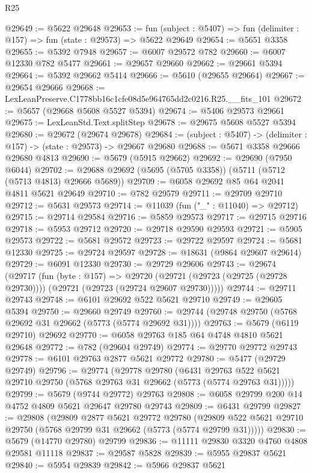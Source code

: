 \begin{lexlean}{R25}
\begin{coremodule}
@29649 := @5622 @29648
@29653 := fun (subject : @5407) => fun (delimiter : @157) => fun (state : @29573) => @5622 @29649
@29654 := @5651 @3358
@29655 := @5392 @7948
@29657 := @6007 @29572 @782
@29660 := @6007 @12330 @782 @5477
@29661 := @29657 @29660
@29662 := @29661 @5394
@29664 := @5392 @29662 @5414
@29666 := @5610 (@29655 @29664)
@29667 := @29654 @29666
@29668 := LexLeanPreserve.C1778bb16c1cfe08d5e964765dd2c0216.R25.__fits_101
@29672 := @5657 (@29668 @5608 @5527 @5394)
@29674 := @5406 @29573 @29661
@29675 := LexLeanStd.Text.splitStep
@29678 := @29675 @5608 @5527 @5394
@29680 := @29672 (@29674 @29678)
@29684 := (subject : @5407) -> (delimiter : @157) -> (state : @29573) -> @29667 @29680
@29688 := @5671 @3358 @29666 @29680 @4813
@29690 := @5679 (@5915 @29662)
@29692 := @29690 (@7950 @6044)
@29702 := @29688 @29692 (@5695 (@5705 @3358)) (@5711 (@5712 (@5713 @4813) @29666 @5689))
@29709 := @6058 @29692 @85 @64 @2041 @4811 @5621 @29649
@29710 := @782 @29579
@29711 := @29709 @29710
@29712 := @5631 @29573
@29714 := @11039 (fun ("_" : @11040) => @29712)
@29715 := @29714 @29584
@29716 := @5859 @29573
@29717 := @29715 @29716
@29718 := @5953 @29712
@29720 := @29718 @29590 @29593
@29721 := @5905 @29573
@29722 := @5681 @29572
@29723 := @29722 @29597
@29724 := @5681 @12330
@29725 := @29724 @29597
@29728 := @18631 (@9864 @29607 @29614)
@29729 := @6091 @12330
@29730 := @29729 @29606
@29743 := @29674
    (@29717
      (fun (byte : @157) =>
      @29720 (@29721 (@29723 (@29725 (@29728 @29730)))) (@29721 (@29723 (@29724 @29607 @29730)))))
@29744 := @29711 @29743
@29748 := @6101 @29692 @522 @5621 @29710
@29749 := @29605 @5394
@29750 := @29660 @29749
@29760 := @29744 (@29748 @29750 (@5768 @29692 @31 @29662 (@5773 (@5774 @29692 @31))))
@29763 := @5679 (@6119 @29710) @29692
@29770 := @6058 @29763 @185 @64 @4748 @4810 @5621 @29648
@29772 := @782 (@29604 @29749)
@29774 := @29770 @29772 @29743
@29778 := @6101 @29763 @2877 @5621 @29772
@29780 := @5477 (@29729 @29749)
@29796 := @29774
    (@29778
      @29780
      (@6431 @29763 @522 @5621 @29710 @29750 (@5768 @29763 @31 @29662 (@5773 (@5774 @29763 @31)))))
@29799 := @5679 (@9744 @29772) @29763
@29808 := @6058 @29799 @200 @14 @4752 @4809 @5621 @29647 @29780 @29743
@29809 := @6431 @29799
@29827 := @29808
    (@29809
      @2877
      @5621
      @29772
      @29780
      (@29809 @522 @5621 @29710 @29750 (@5768 @29799 @31 @29662 (@5773 (@5774 @29799 @31)))))
@29830 := @5679 (@14770 @29780) @29799
@29836 := @11111 @29830 @3320 @4760 @4808 @29581 @11118
@29837 := @29587 @5828
@29839 := @5955 @29837 @5621
@29840 := @5954 @29839
@29842 := @5966 @29837 @5621

\end{coremodule}
\end{lexlean}

